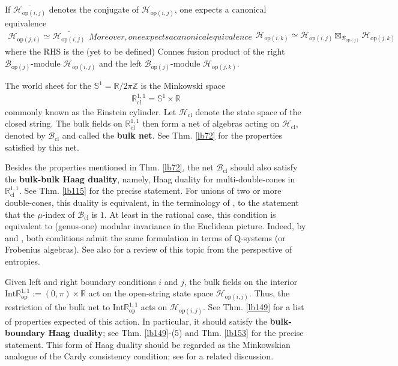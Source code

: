 \documentclass[11pt,b5paper,notitlepage]{article}
\theoremstyle{definition}
\theoremstyle{plain}
\newcommand{\ovl}{\overline}
\newcommand{\Zbb}{\mathbb Z}
\newcommand{\Rbb}{\mathbb R}
\newcommand{\Sbb}{{\mathbb S}}
\newcommand{\Int}{\mathrm{Int}}
\newcommand{\Rcl}{\mathbb R^{1,1}_{\mathrm{cl}}}
\newcommand{\Rop}{\mathbb R^{1,1}_{\mathrm{op}}}
\newcommand{\Bcl}{\mathcal B_{\mathrm{cl}}}
\newcommand{\Hcl}{\mathcal H_{\mathrm{cl}}}
\newcommand{\Bopj}{\mathcal B_{\mathrm{op}(j)}}
\newcommand{\Hop}[1]{\mathcal H_{\mathrm{op}({#1})}}
\newcommand{\Hopij}{\mathcal H_{\mathrm{op}(i,j)}}
\newcommand{\Hopji}{\mathcal H_{\mathrm{op}(j,i)}}
\numberwithin{equation}{section}
\begin{document}
If $\ovl{\Hopij}$ denotes the conjugate of $\Hopij$, one expects a canonical equivalence
\begin{subequations}\label{eq80}
\begin{align}
\Hopji\simeq\ovl{\Hopij}
\end{align}
Moreover, one expects a canonical equivalence
\begin{align}
\Hop{i,k}\simeq\Hopij\boxtimes_{\Bopj}\Hop{j,k}
\end{align}
\end{subequations}
where the RHS is the (yet to be defined) Connes fusion product of the right $\Bopj$-module $\Hopij$ and the left $\Bopj$-module $\Hop{j,k}$.


The world sheet for the  $\Sbb^1=\Rbb/2\pi\Zbb$ is the Minkowski space
\begin{align*}
\Rcl=\Sbb^1\times\Rbb
\end{align*}
commonly known as the Einstein cylinder. Let $\pmb{\Hcl}$ denote the state space of the closed string. The bulk fields on $\Rcl$ then form a net of algebras acting on $\Hcl$, denoted by $\pmb{\Bcl}$ and called the \textbf{bulk net}. See Thm. \ref{lb72} for the properties satisfied by this net. 

Besides the properties mentioned in Thm. \ref{lb72}, the net $\Bcl$ should also satisfy the \textbf{bulk-bulk Haag duality}, namely, Haag duality for multi-double-cones in $\Rcl$. See Thm. \ref{lb115} for the precise statement. For unions of two or more double-cones, this duality is equivalent, in the terminology of \cite{BKL15}, to the statement that the $\mu$-index of $\Bcl$ is $1$. At least in the rational case, this condition is equivalent to (genus-one) modular invariance in the Euclidean picture. Indeed, by \cite[Prop. 6.6]{BKL15} and \cite[Thm. 6.7]{Kong08b}, both conditions admit the same formulation in terms of Q-systems (or Frobenius algebras). See also \cite{BCKLM24} for a review of this topic from the perspective of entropies.






Given left and right boundary conditions $i$ and $j$, the bulk fields on the interior $\Int\Rop:=(0,\pi)\times\Rbb$ act on the open-string state space $\Hopij$. Thus, the restriction of the bulk net to $\Int\Rop$ acts on $\Hopij$. See Thm. \ref{lb149} for a list of properties expected of this action. In particular, it should satisfy the \textbf{bulk-boundary Haag duality}; see Thm. \ref{lb149}-(5) and Thm. \ref{lb153} for the precise statement. This form of Haag duality should be regarded as the Minkowskian analogue of the Cardy consistency condition; see \cite[Sec. 4.2]{KR10} for a related discussion.
\end{document}
